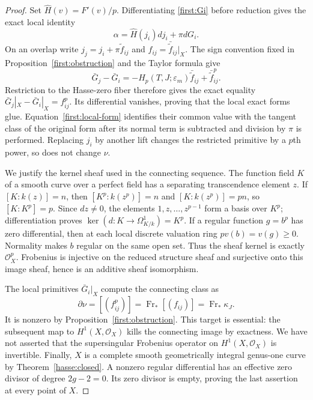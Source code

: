 \begin{proof}
Set $\widehat H(v)=F'(v)/p$. Differentiating \eqref{first:Gi} before
reduction gives the exact local identity
\begin{equation}
 \alpha=\widehat H(j_i)dj_i+\pi dG_i.
 \label{first:local-form}
\end{equation}
On an overlap write $j_j=j_i+\pi\widetilde f_{ij}$ and
$f_{ij}=\bar{\widetilde f}_{ij}|_X$. The sign convention fixed in
Proposition~\ref{first:obstruction} and the Taylor formula give
\[
 \bar G_j-\bar G_i
 =-H_p(T,J;\varepsilon_m)\bar{\widetilde f}_{ij}
   +\bar{\widetilde f}_{ij}^{p}.
\]
Restriction to the Hasse-zero fiber therefore gives the exact equality
$\bar G_j|_X-\bar G_i|_X=f_{ij}^p$. Its differential vanishes, proving
that the local exact forms glue. Equation~\eqref{first:local-form}
identifies their common value with the tangent class of the original
form after its normal term is subtracted and division by $\pi$ is
performed. Replacing $j_i$ by another lift changes the restricted
primitive by a $p$th power, so does not change $\nu$.

We justify the kernel sheaf used in the connecting sequence. The
function field $K$ of a smooth curve over a perfect field has a
separating transcendence element $z$. If $[K:k(z)]=n$, then
$[K^p:k(z^p)]=n$ and $[K:k(z^p)]=pn$, so $[K:K^p]=p$.
Since $dz\ne0$, the elements $1,z,\ldots,z^{p-1}$ form a basis over
$K^p$; differentiation proves $\ker(d:K\to\Omega^1_{K/k})=K^p$.
If a regular function $g=b^p$ has zero differential, then at each
local discrete valuation ring $pv(b)=v(g)\ge0$. Normality makes
$b$ regular on the same open set. Thus the sheaf kernel is exactly
$\mathcal O_X^p$. Frobenius is injective on the reduced structure
sheaf and surjective onto this image sheaf, hence is an additive
sheaf isomorphism.

The local primitives $\bar G_i|_X$ compute the connecting class as
\[
 \partial\nu=[(f_{ij}^p)]
 =\operatorname{Fr}_*[(f_{ij})]=\operatorname{Fr}_*\kappa_J.
\]
It is nonzero by Proposition~\ref{first:obstruction}. This target is
essential: the subsequent map to $H^1(X,\mathcal O_X)$ kills the
connecting image by exactness. We have not asserted that the
supersingular Frobenius operator on $H^1(X,\mathcal O_X)$ is invertible.
Finally, $X$ is a complete smooth geometrically integral genus-one
curve by Theorem~\ref{hasse:closed}. A nonzero regular differential
has an effective zero divisor of degree $2g-2=0$. Its zero divisor
is empty, proving the last assertion at every point of $X$.
\end{proof}

